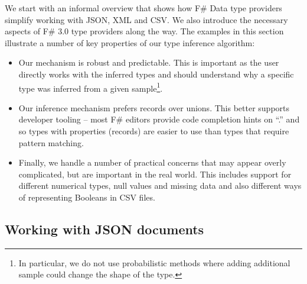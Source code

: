 \documentclass[10pt,preprint,clearpagebib]{sigplanconf}
\newcommand{\kvd}[1]{\textnormal{\textcolor{kvdclr}{\sffamily #1}}}
\begin{document}
We start with an informal overview that shows how F\# Data type providers simplify working with 
JSON, XML and CSV. We also introduce the necessary aspects of F\# 3.0 type providers along the 
way. The examples in this section illustrate a number of key properties of our type inference 
algorithm:

\begin{itemize}
\item Our mechanism is robust and predictable. This is important as the user directly works with 
  the inferred types and should understand why a specific type was inferred from a given 
  sample\footnote{In particular, we do not use probabilistic methods where adding additional 
  sample could change the shape of the type.}.

\item Our inference mechanism prefers records over unions. This better supports developer tooling --
  most F\# editors provide code completion hints on ``.'' and so types with properties (records)
  are easier to use than types that require pattern matching.

\item Finally, we handle a number of practical concerns that may appear overly complicated, but
  are important in the real world. This includes support for different numerical types, \kvd{null}
  values and missing data and also different ways of representing Booleans in CSV files.
\end{itemize}


\subsection{Working with JSON documents}
\label{sec:providers-json}
\end{document}
